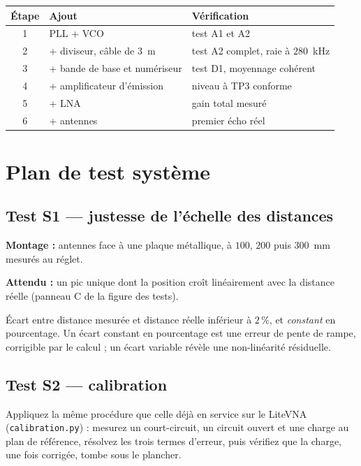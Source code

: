 \begin{table}[H]
\centering
\begin{tabular}{clp{7.4cm}}
\toprule
Étape & Ajout & Vérification \\
\midrule
1 & PLL + VCO & test A1 et A2 \\
2 & + diviseur, câble de $3$~m & test A2 complet, raie à $280$~kHz \\
3 & + bande de base et numériseur & test D1, moyennage cohérent \\
4 & + amplificateur d'émission & niveau à TP3 conforme \\
5 & + LNA & gain total mesuré \\
6 & + antennes & premier écho réel \\
\bottomrule
\end{tabular}
\end{table}

\section{Plan de test système}

\subsection{Test S1 --- justesse de l'échelle des distances}

\textbf{Montage :} antennes face à une plaque métallique, à $100$, $200$ puis
$300$~mm mesurés au réglet.

\textbf{Attendu :} un pic unique dont la position croît linéairement avec la
distance réelle (panneau C de la figure des tests).

\begin{critere}
Écart entre distance mesurée et distance réelle inférieur à $2\,\%$, et
\emph{constant} en pourcentage. Un écart constant en pourcentage est une erreur
de pente de rampe, corrigible par le calcul ; un écart variable révèle une
non-linéarité résiduelle.
\end{critere}

\subsection{Test S2 --- calibration}

Appliquez la même procédure que celle déjà en service sur le LiteVNA
(\texttt{calibration.py}) : mesurez un court-circuit, un circuit ouvert et
une charge au plan de référence, résolvez les trois termes d'erreur, puis
vérifiez que la charge, une fois corrigée, tombe sous le plancher.

